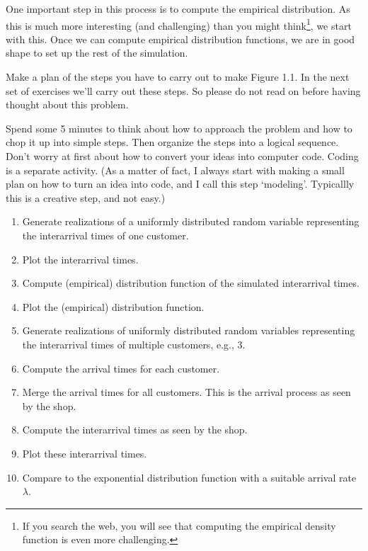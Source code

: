 \documentclass{scrartcl}
\begin{document}
One important step in this process is to compute the empirical distribution. As this is much more interesting (and challenging) than you might think\footnote{If you search the web, you will see that computing the empirical density function is even more challenging.}, we start with this. Once we can compute empirical distribution functions, we are in good shape to set up the rest of the simulation. 

\begin{exercise}
  Make a plan of the steps you have to carry out to make Figure 1.1. In the next set of exercises we'll carry out these steps. So please do not read on before having thought about this problem.

  Spend some 5 minutes to think about how to approach the problem and how to chop it up into simple steps. Then organize the steps into a logical sequence. Don't worry at first about how to convert your ideas into computer code. Coding is a separate activity.  (As a matter of fact, I always start with making a small plan on how to turn an idea into code, and I call this step `modeling'. Typicallly this is a creative step, and not easy.) 

  \begin{solution}
    \begin{enumerate}
    \item Generate realizations of a uniformly distributed random variable representing the interarrival times of one customer.
    \item Plot the interarrival times.
    \item Compute (empirical) distribution function of the simulated interarrival times.
    \item Plot the (empirical) distribution function.
    \item Generate realizations of uniformly distributed random variables representing the interarrival times of multiple customers, e.g., 3. 
    \item Compute the arrival times for each customer.
    \item Merge  the arrival times for all customers. This is the arrival process as seen by the shop.
    \item Compute the interarrival times as seen by the shop.
    \item Plot these interarrival times.
    \item Compare to the exponential distribution function with a suitable arrival rate $\lambda$. 
    \end{enumerate}
  \end{solution}
\end{exercise}
\end{document}
